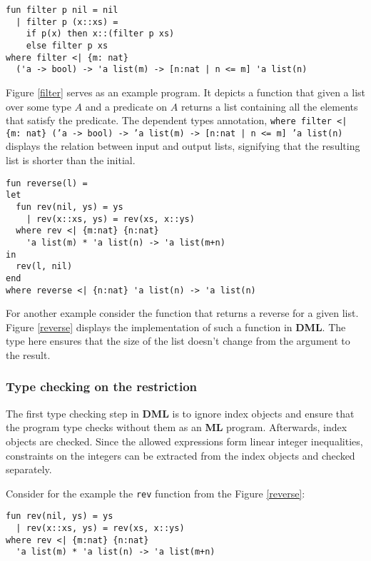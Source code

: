 \documentclass[a4paper,UKenglish]{lipics-v2016}
\begin{document}
\begin{lstlisting}[caption={The filter function for lists},label=filter,captionpos=t,float,abovecaptionskip=-\medskipamount]
fun filter p nil = nil
  | filter p (x::xs) =
    if p(x) then x::(filter p xs)
    else filter p xs
where filter <| {m: nat}
  ('a -> bool) -> 'a list(m) -> [n:nat | n <= m] 'a list(n)
\end{lstlisting}

Figure \ref{filter} serves as an example program. It depicts a function that
given a list over some type $A$ and a predicate on $A$ returns a list
containing all the elements that satisfy the predicate. The dependent types
annotation, \texttt{where filter <| \{m: nat\} ('a -> bool) -> 'a list(m) ->
[n:nat | n <= m] 'a list(n)} displays the relation between input and output
lists, signifying that the resulting list is shorter than the initial.

\begin{lstlisting}[caption={The reverse function for lists},label=reverse,captionpos=t,float,abovecaptionskip=-\medskipamount]
fun reverse(l) =
let
  fun rev(nil, ys) = ys
    | rev(x::xs, ys) = rev(xs, x::ys)
  where rev <| {m:nat} {n:nat}
    'a list(m) * 'a list(n) -> 'a list(m+n)
in
  rev(l, nil)
end
where reverse <| {n:nat} 'a list(n) -> 'a list(n)
\end{lstlisting}

For another example consider the function that returns a reverse for a given
list. Figure \ref{reverse} displays the implementation of such a function in
\textbf{DML}. The type here ensures that the size of the list doesn't change
from the argument to the result.

\subsubsection{Type checking on the restriction}

The first type checking step in \textbf{DML} is to ignore index objects and
ensure that the program type checks without them as an \textbf{ML} program.
Afterwards, index objects are checked. Since the allowed expressions form
linear integer inequalities, constraints on the integers can be extracted from
the index objects and checked separately.

Consider for the example the \texttt{rev} function from the Figure
\ref{reverse}:
\begin{verbatim}
fun rev(nil, ys) = ys
  | rev(x::xs, ys) = rev(xs, x::ys)
where rev <| {m:nat} {n:nat}
  'a list(m) * 'a list(n) -> 'a list(m+n)
\end{verbatim}
\end{document}
